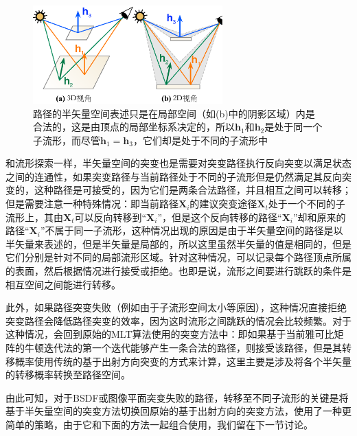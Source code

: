 \begin{figure}
	\sidecaption
	\includegraphics[width=0.65\textwidth]{figures/mlt/submanifolds}
	\caption{路径的半矢量空间表述只是在局部空间（如(b)中的阴影区域）内是合法的，这是由顶点的局部坐标系决定的，所以$\mathbf{h}_1$和$\mathbf{h}_2$是处于同一个子流形，而尽管$\mathbf{h}_1=\mathbf{h}_3$，它们却是处于不同的子流形中}
	\label{f:mlt-submanifolds}
\end{figure}

和流形探索一样，半矢量空间的突变也是需要对突变路径执行反向突变以满足状态之间的连通性，如果突变路径与当前路径处于不同的子流形但是仍然满足其反向突变的，这种路径是可接受的，因为它们是两条合法路径，并且相互之间可以转移；但是需要注意一种特殊情况：即当前路径$\mathbf{X}_i$的建议突变途径$\mathbf{X}_t$处于一个不同的子流形上，其由$\mathbf{X}_t$可以反向转移到“$\mathbf{X}_i$”，但是这个反向转移的路径“$\mathbf{X}_i$”却和原来的路径“$\mathbf{X}_i$”不属于同一子流形，这种情况出现的原因是由于半矢量空间的路径是以半矢量来表述的，但是半矢量是局部的，所以这里虽然半矢量的值是相同的，但是它们分别是针对不同的局部流形区域。针对这种情况，可以记录每个路径顶点所属的表面，然后根据情况进行接受或拒绝。也即是说，流形之间要进行跳跃的条件是相互空间之间能进行转移。

此外，如果路径突变失败（例如由于子流形空间太小等原因），这种情况直接拒绝突变路径会降低路径突变的效率，因为这时流形之间跳跃的情况会比较频繁。对于这种情况，\cite{a:TheNaturalConstraintRepresentationofthePathSpaceforEfficientLightTransportSimulation}会回到原始的MLT算法\cite{a:MetropolisLightTransport}使用的突变方法中：即如果基于当前雅可比矩阵的牛顿迭代法的第一个迭代能够产生一条合法的路径，则接受该路径，但是其转移概率使用传统的基于出射方向突变的方式来计算，这里主要是涉及将各个半矢量的转移概率转换至路径空间。

由此可知，对于BSDF或图像平面突变失败的路径，转移至不同子流形的关键是将基于半矢量空间的突变方法切换回原始的基于出射方向的突变方法，\cite{a:ImprovedHalfVectorSpaceLightTransport}使用了一种更简单的策略，由于它和下面的方法一起组合使用，我们留在下一节讨论。




